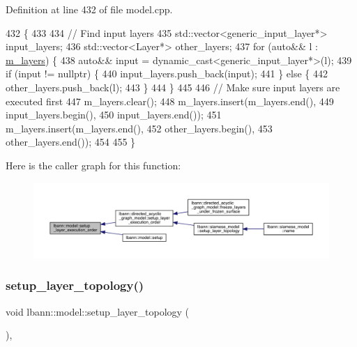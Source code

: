 Definition at line 432 of file model.\+cpp.


\begin{DoxyCode}
432                                         \{
433 
434   \textcolor{comment}{// Find input layers}
435   std::vector<generic\_input\_layer*> input\_layers;
436   std::vector<Layer*> other\_layers;
437   \textcolor{keywordflow}{for} (\textcolor{keyword}{auto}&& l : \hyperlink{classlbann_1_1model_a0229fc226ec163d1411548446104569d}{m\_layers}) \{
438     \textcolor{keyword}{auto}&& input = \textcolor{keyword}{dynamic\_cast<}generic\_input\_layer*\textcolor{keyword}{>}(l);
439     \textcolor{keywordflow}{if} (input != \textcolor{keyword}{nullptr}) \{
440       input\_layers.push\_back(input);
441     \} \textcolor{keywordflow}{else} \{
442       other\_layers.push\_back(l);
443     \}
444   \}
445 
446   \textcolor{comment}{// Make sure input layers are executed first}
447   m\_layers.clear();
448   m\_layers.insert(m\_layers.end(),
449                   input\_layers.begin(),
450                   input\_layers.end());
451   m\_layers.insert(m\_layers.end(),
452                   other\_layers.begin(),
453                   other\_layers.end());
454 
455 \}
\end{DoxyCode}
Here is the caller graph for this function\+:\nopagebreak
\begin{figure}[H]
\begin{center}
\leavevmode
\includegraphics[width=350pt]{classlbann_1_1model_ab0e8af146d4121c1b8b04b4a3c2a455c_icgraph}
\end{center}
\end{figure}
\mbox{\label{classlbann_1_1model_a7b3e2a643c658dcaa7478d2568f29784}} 
\subsubsection{\texorpdfstring{setup\+\_\+layer\+\_\+topology()}{setup\_layer\_topology()}}
{\footnotesize\ttfamily void lbann\+::model\+::setup\+\_\+layer\+\_\+topology (\begin{DoxyParamCaption}{ }\end{DoxyParamCaption})\hspace{0.3cm}{\ttfamily [protected]}, {\ttfamily [virtual]}}

